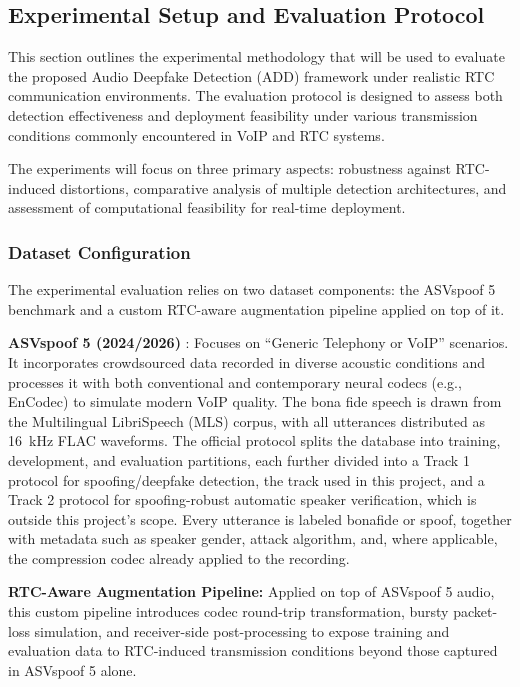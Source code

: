 \subsection{Experimental Setup and Evaluation Protocol}

This section outlines the experimental methodology that will be used to evaluate the proposed Audio Deepfake Detection (ADD) framework under realistic RTC communication environments. The evaluation protocol is designed to assess both detection effectiveness and deployment feasibility under various transmission conditions commonly encountered in VoIP and RTC systems.

The experiments will focus on three primary aspects: robustness against RTC-induced distortions, comparative analysis of multiple detection architectures, and assessment of computational feasibility for real-time deployment.

\subsubsection{Dataset Configuration}

The experimental evaluation relies on two dataset components: the ASVspoof 5 benchmark and a custom RTC-aware augmentation pipeline applied on top of it.

\textbf{ASVspoof 5 (2024/2026)} \cite{wang24_asvspoof}: Focuses on ``Generic Telephony or VoIP'' scenarios. It incorporates crowdsourced data recorded in diverse acoustic conditions and processes it with both conventional and contemporary neural codecs (e.g., EnCodec) to simulate modern VoIP quality. The bona fide speech is drawn from the Multilingual LibriSpeech (MLS) corpus, with all utterances distributed as 16~kHz FLAC waveforms. The official protocol splits the database into training, development, and evaluation partitions, each further divided into a Track 1 protocol for spoofing/deepfake detection, the track used in this project, and a Track 2 protocol for spoofing-robust automatic speaker verification, which is outside this project's scope. Every utterance is labeled bonafide or spoof, together with metadata such as speaker gender, attack algorithm, and, where applicable, the compression codec already applied to the recording.

\textbf{RTC-Aware Augmentation Pipeline:} Applied on top of ASVspoof 5 audio, this custom pipeline introduces codec round-trip transformation, bursty packet-loss simulation, and receiver-side post-processing to expose training and evaluation data to RTC-induced transmission conditions beyond those captured in ASVspoof 5 alone.

